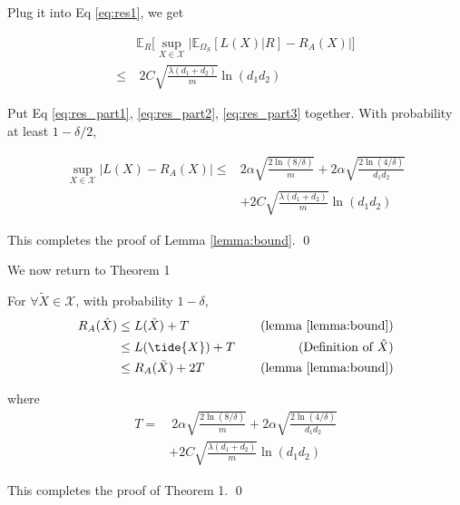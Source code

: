 \documentclass[conference]{IEEEtran}
\numberwithin{equation}{section}
\newcommand{\supX}{\sup_{X \in \mathcal{X}}}
\newtheorem{sampling strategy}{Sampling Strategy}
\begin{document}
Plug it into Eq \ref{eq:res1}, we get 

\begin{equation}
    \begin{aligned}
    & \mathbb{E}_R \Big[ \sup_{X \in \mathcal{X}} \big|\mathbb{E}_{\Omega_S} [L(X) | R] - R_A(X) \big| \Big] \nonumber \\
    \leq & ~ 2 C \sqrt{\frac{\lambda (d_1 + d_2)}{m}} \ln(d_1 d_2) \label{eq:res_part3}
    \end{aligned}
\end{equation}

Put Eq \ref{eq:res_part1}, \ref{eq:res_part2}, \ref{eq:res_part3} together. With probability at least $1 - \delta /2$,

\begin{equation}
    \begin{aligned}
        \supX |L(X) - R_A(X)| \leq & 2 \alpha \sqrt{\frac{2\ln(8/\delta)}{m}} + 2\alpha \sqrt{ \frac{2\ln(4/\delta) }{d_1 d_2} } \\
        & + 2 C \sqrt{\frac{\lambda (d_1 + d_2)}{m}} \ln(d_1 d_2)
    \end{aligned}
\end{equation}

This completes the proof of Lemma \ref{lemma:bound}.
\qed 

We now return to Theorem 1 %

For $\forall \tilde{X} \in \mathcal{X}$, with probability $1 - \delta$,
\begin{equation}
    \begin{aligned}
        R_A(\hat{X}) & \leq L(\hat{X}) + T &~~~\text{(lemma \ref{lemma:bound})} \\
        & \leq L(\tide{X}) + T &\text{(Definition of $\hat{X}$)} \\
        & \leq R_A(\tilde{X}) + 2T  &\text{(lemma \ref{lemma:bound})} \nonumber    
    \end{aligned}
\end{equation}

where
\begin{align}
    T = &~ 2 \alpha \sqrt{\frac{2\ln(8/\delta)}{m}} + 2\alpha \sqrt{ \frac{2\ln(4/\delta) }{d_1 d_2} } \nonumber \\
     & + 2 C \sqrt{\frac{\lambda(d_1 + d_2)}{m}} \ln(d_1 d_2) \nonumber
\end{align}


This completes the proof of Theorem 1. \qed 

\end{document}
